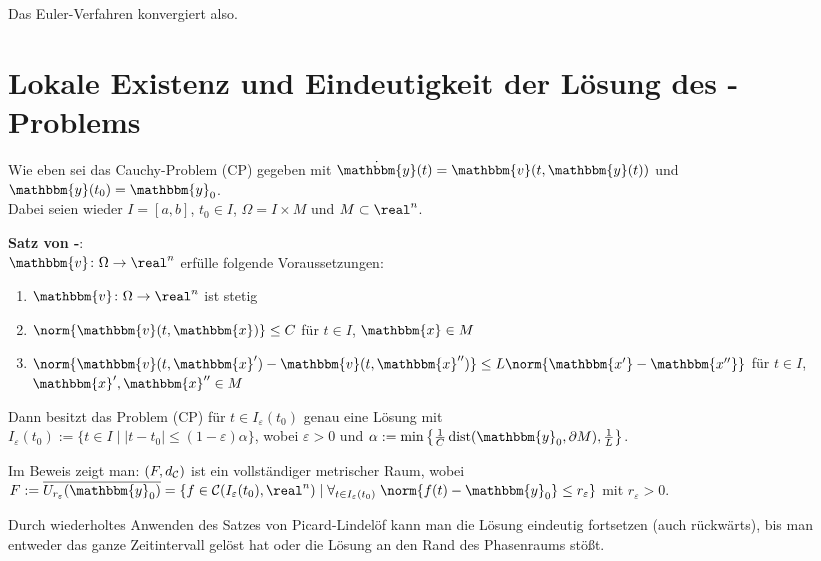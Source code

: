 Das Euler-Verfahren konvergiert also.

\section{%
    Lokale Existenz und Eindeutigkeit der Lösung des -Problems%
}

Wie eben sei das Cauchy-Problem (CP) gegeben mit
$\dot{\mathbbm{y}}(t) = \mathbbm{v}(t, \mathbbm{y}(t))$ und
$\mathbbm{y}(t_0) = \mathbbm{y}_0$. \\
Dabei seien wieder $I = [a, b]$, $t_0 \in I$, $\Omega = I \times M$ und
$M \subset \real^n$.

\textbf{Satz von -}: \\
$\mathbbm{v}\colon \Omega \rightarrow \real^n$ erfülle folgende
Voraussetzungen:
\begin{enumerate}
    \item
    $\mathbbm{v}\colon \Omega \rightarrow \real^n$ ist stetig

    \item
    $\norm{\mathbbm{v}(t, \mathbbm{x})} \le C$ für
    $t \in I$, $\mathbbm{x} \in M$

    \item
    $\norm{\mathbbm{v}(t, \mathbbm{x}') - \mathbbm{v}(t, \mathbbm{x}'')} \le
    L \norm{\mathbbm{x'} - \mathbbm{x''}}$ für
    $t \in I$, $\mathbbm{x}', \mathbbm{x}'' \in M$
\end{enumerate}
Dann besitzt das Problem (CP) für $t \in I_\varepsilon(t_0)$
genau eine Lösung mit \\
$I_\varepsilon(t_0) := \{t \in I \;|\;
|t - t_0| \le (1 - \varepsilon) \alpha\}$, wobei $\varepsilon > 0$ und
$\alpha := \min\left\{\frac{1}{C} \dist(\mathbbm{y}_0, \partial M),
\frac{1}{L}\right\}$.

Im Beweis zeigt man:
$(F, d_{\mathcal{C}})$ ist ein vollständiger metrischer Raum, wobei \\
$F := \overline{U_{r_\varepsilon}(\mathbbm{y}_0)} =
\{f \in \C(I_\varepsilon(t_0), \real^n) \;|\;
\forall_{t \in I_\varepsilon(t_0)}\;
\norm{f(t) - \mathbbm{y}_0} \le r_\varepsilon\}$ mit $r_\varepsilon > 0$.

\linie

Durch wiederholtes Anwenden des Satzes von Picard-Lindelöf kann man die Lösung
eindeutig fortsetzen (auch rückwärts), bis man entweder das ganze Zeitintervall
gelöst hat oder die Lösung an den Rand des Phasenraums stößt.

